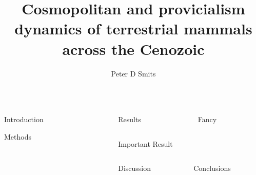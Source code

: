 \documentclass[final]{beamer}
\title{Cosmopolitan and provicialism dynamics of terrestrial mammals across the Cenozoic}
\author{Peter D Smits}
\institute{Committee on Evolutionary Biology, University of Chicago}
\newlength{\onecolwid}
\newlength{\twocolwid}
\begin{document}
\begin{frame}[t]
  \begin{columns}
    \begin{column}{\onecolwid}
      \begin{block}{Introduction}
        
      \end{block}

      \begin{block}{Methods}
        
      \end{block}
    \end{column}

    \begin{column}{\twocolwid}
      \begin{columns}[t,totalwidth = \twocolwid]
        \begin{column}{\onecolwid}
          \begin{block}{Results}

          \end{block}
        \end{column}

        \begin{column}{\onecolwid}
          \begin{block}{Fancy}
           
          \end{block}
        \end{column}
      \end{columns}

      \begin{alertblock}{Important Result}
        
      \end{alertblock}

      \begin{columns}[t,totalwidth = \twocolwid]
        \begin{column}{\onecolwid}
          \begin{block}{Discussion}

          \end{block}
        \end{column}

        \begin{column}{\onecolwid}
          \begin{block}{Conclusions}
           
          \end{block}
        \end{column}
      \end{columns}
    \end{column}
  \end{columns}
\end{frame}
\end{document}
